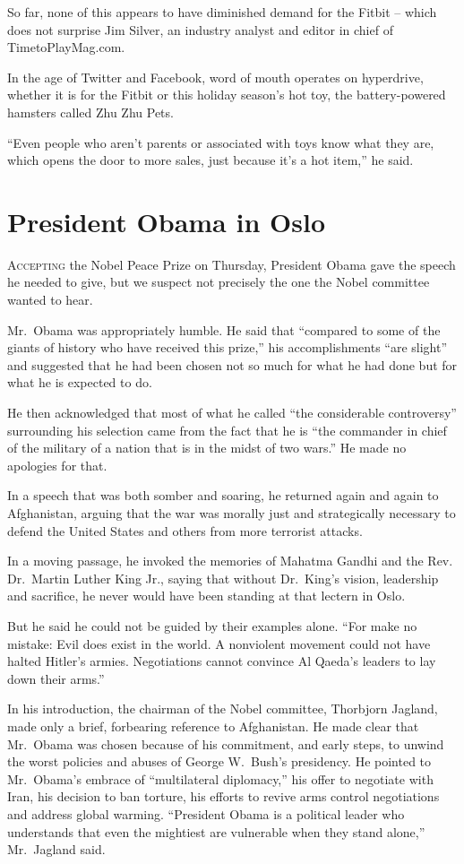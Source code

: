﻿\documentclass[12pt]{article}
\begin{document}
So far, none of this appears to have diminished demand for the Fitbit -- which does not surprise Jim
Silver, an industry analyst and editor in chief of TimetoPlayMag.com.

In the age of Twitter and Facebook, word of mouth operates on hyperdrive, whether it is for the
Fitbit or this holiday season's hot toy, the battery-powered hamsters called Zhu Zhu Pets.

``Even people who aren't parents or associated with toys know what they are, which opens the door to
more sales, just because it's a hot item,'' he said.

\section{President Obama in Oslo}

\lettrine{A}{ccepting} the Nobel Peace Prize on Thursday, President Obama
gave the speech he needed to give, but we suspect not precisely the one the Nobel committee wanted
to hear.

Mr.~Obama was appropriately humble. He said that ``compared to some of the giants of history who
have received this prize,'' his accomplishments ``are slight'' and suggested that he had been chosen
not so much for what he had done but for what he is expected to do.

He then acknowledged that most of what he called ``the considerable controversy'' surrounding his
selection came from the fact that he is ``the commander in chief of the military of a nation that is
in the midst of two wars.'' He made no apologies for that.

In a speech that was both somber and soaring, he returned again and again to Afghanistan, arguing
that the war was morally just and strategically necessary to defend the United States and others
from more terrorist attacks.

In a moving passage, he invoked the memories of Mahatma Gandhi and the Rev. Dr.~Martin Luther King
Jr., saying that without Dr.~King's vision, leadership and sacrifice, he never would have been
standing at that lectern in Oslo.

But he said he could not be guided by their examples alone. ``For make no mistake: Evil does exist
in the world. A nonviolent movement could not have halted Hitler's armies. Negotiations cannot
convince Al Qaeda's leaders to lay down their arms.''

In his introduction, the chairman of the Nobel committee, Thorbjorn Jagland, made only a brief,
forbearing reference to Afghanistan. He made clear that Mr.~Obama was chosen because of his
commitment, and early steps, to unwind the worst policies and abuses of George W.~Bush's presidency.
He pointed to Mr.~Obama's embrace of ``multilateral diplomacy,'' his offer to negotiate with Iran,
his decision to ban torture, his efforts to revive arms control negotiations and address global
warming. ``President Obama is a political leader who understands that even the mightiest are
vulnerable when they stand alone,'' Mr.~Jagland said.
\end{document}
